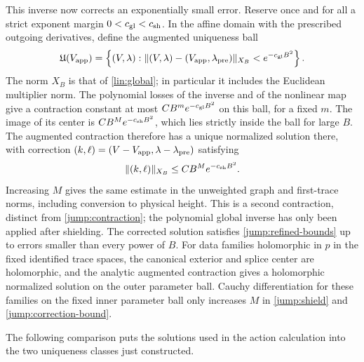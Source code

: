 This inverse now corrects an exponentially small error.  Reserve
once and for all a strict exponent margin
$0<c_{\rm gl}<c_{\rm sh}$.  In the affine domain with the prescribed
outgoing derivatives, define the augmented uniqueness ball
\begin{equation}\label{jump:augmented-ball}
 \mathfrak U(V_{\rm app})=
 \left\{(V,\lambda):
 \|(V,\lambda)-(V_{\rm app},\lambda_{\rm pre})\|_{X_B}
                          <e^{-c_{\rm gl}B^2}\right\}.
\end{equation}
The norm $X_B$ is that of \cref{lin:global}; in particular it
includes the Euclidean multiplier norm.  The polynomial losses of
the inverse and of the nonlinear map give a contraction constant
at most $CB^m e^{-c_{\rm gl}B^2}$ on this ball, for a fixed $m$.
The image of its center is $CB^M e^{-c_{\rm sh}B^2}$, which lies
strictly inside the ball for large $B$.  The augmented contraction
therefore has a unique normalized solution there, with correction
$(k,\ell)=(V-V_{\rm app},\lambda-\lambda_{\rm pre})$ satisfying
\begin{equation}\label{jump:correction-bound}
 \|(k,\ell)\|_{X_B}\leq CB^M e^{-c_{\rm sh}B^2}.
\end{equation}
Increasing $M$ gives the same estimate in the unweighted graph
and first-trace norms, including conversion to physical height.
This is a second contraction, distinct from
\eqref{jump:contraction}; the polynomial global inverse has only
been applied after shielding.  The corrected solution satisfies
\eqref{jump:refined-bounds} up to errors smaller than every power
of $B$.  For data families holomorphic in $p$ in the fixed identified
trace spaces, the canonical exterior and splice center are holomorphic,
and the analytic augmented contraction gives a holomorphic normalized
solution on the outer parameter ball.  Cauchy differentiation for
these families on the fixed inner parameter ball
only increases $M$ in \eqref{jump:shield} and
\eqref{jump:correction-bound}.

The following comparison puts the solutions used in the action
calculation into the two uniqueness classes just constructed.

